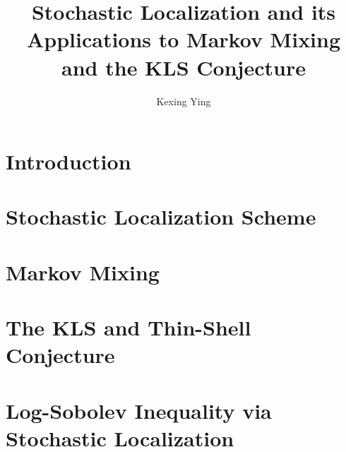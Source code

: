 \documentclass[]{article}
\title{Stochastic Localization and its Applications to Markov Mixing and the KLS Conjecture}
\author{Kexing Ying}
\theoremstyle{definition}
\begin{document}
\maketitle
\thispagestyle{empty}

\newpage
\tableofcontents
\thispagestyle{empty}

\newpage
\section{Introduction}
\label{sec:introduction}


\newpage
\section{Stochastic Localization Scheme}
\label{sec:stoch_loc}


\newpage
\section{Markov Mixing}
\label{sec:mixing}


\newpage
\section{The KLS and Thin-Shell Conjecture}
\label{sec:KLS}



\newpage
\section{Log-Sobolev Inequality via Stochastic Localization}
\label{sec:log-Sobolev}


\newpage


\end{document}
